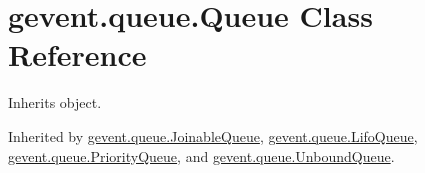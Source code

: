 \hypertarget{classgevent_1_1queue_1_1_queue}{}\section{gevent.\+queue.\+Queue Class Reference}
\label{classgevent_1_1queue_1_1_queue}


Inherits object.



Inherited by \hyperlink{classgevent_1_1queue_1_1_joinable_queue}{gevent.\+queue.\+Joinable\+Queue}, \hyperlink{classgevent_1_1queue_1_1_lifo_queue}{gevent.\+queue.\+Lifo\+Queue}, \hyperlink{classgevent_1_1queue_1_1_priority_queue}{gevent.\+queue.\+Priority\+Queue}, and \hyperlink{classgevent_1_1queue_1_1_unbound_queue}{gevent.\+queue.\+Unbound\+Queue}.

